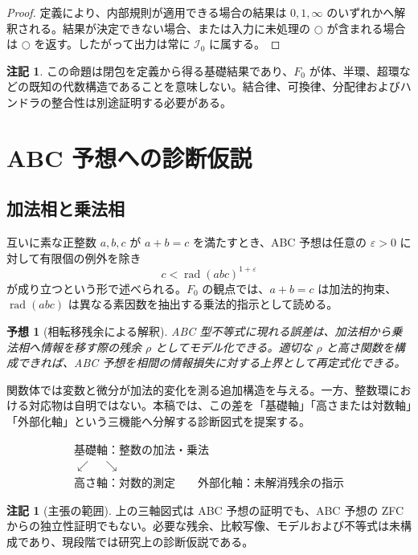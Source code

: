 \documentclass[a4paper,11pt]{ltjsarticle}
\theoremstyle{definition}
\newtheorem{remark}[definition]{注記}
\theoremstyle{plain}
\newtheorem{conjecture}[definition]{予想}
\newcommand{\dfix}{\bigcirc}
\newcommand{\Fzero}{F_{0}}
\newcommand{\rad}{\operatorname{rad}}
\begin{document}
\begin{proof}
定義により、内部規則が適用できる場合の結果は $0,1,\infty$ のいずれかへ解釈される。結果が決定できない場合、または入力に未処理の $\dfix$ が含まれる場合は $\dfix$ を返す。したがって出力は常に $\mathcal{I}_0$ に属する。
\end{proof}

\begin{remark}
この命題は閉包を定義から得る基礎結果であり、$\Fzero$ が体、半環、超環などの既知の代数構造であることを意味しない。結合律、可換律、分配律およびハンドラの整合性は別途証明する必要がある。
\end{remark}

\section{ABC 予想への診断仮説}

\subsection{加法相と乗法相}

互いに素な正整数 $a,b,c$ が $a+b=c$ を満たすとき、ABC 予想は任意の $\varepsilon>0$ に対して有限個の例外を除き
\[
 c<\rad(abc)^{1+\varepsilon}
\]
が成り立つという形で述べられる。$\Fzero$ の観点では、$a+b=c$ は加法的拘束、$\rad(abc)$ は異なる素因数を抽出する乗法的指示として読める。

\begin{conjecture}[相転移残余による解釈]
ABC 型不等式に現れる誤差は、加法相から乗法相へ情報を移す際の残余 $\rho$ としてモデル化できる。適切な $\rho$ と高さ関数を構成できれば、ABC 予想を相間の情報損失に対する上界として再定式化できる。
\end{conjecture}

関数体では変数と微分が加法的変化を測る追加構造を与える。一方、整数環における対応物は自明ではない。本稿では、この差を「基礎軸」「高さまたは対数軸」「外部化軸」という三機能へ分解する診断図式を提案する。

\[
\begin{array}{c}
\text{基礎軸：整数の加法・乗法}\\[2mm]
\swarrow\quad\searrow\\[-1mm]
\text{高さ軸：対数的測定}
\qquad
\text{外部化軸：未解消残余の指示}
\end{array}
\]

\begin{remark}[主張の範囲]
上の三軸図式は ABC 予想の証明でも、ABC 予想の ZFC からの独立性証明でもない。必要な残余、比較写像、モデルおよび不等式は未構成であり、現段階では研究上の診断仮説である。
\end{remark}
\end{document}
